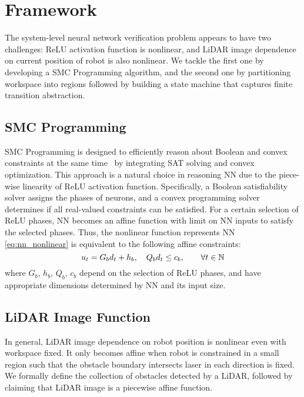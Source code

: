 \section{Framework}

The system-level neural network verification problem appears to have two challenges:
ReLU activation function is nonlinear, and LiDAR image dependence on current position of robot is also nonlinear.
We tackle the first one by developing a SMC Programming algorithm,
and the second one by partitioning workspace into regions followed by building a state machine 
that captures finite transition abstraction.


\subsection{SMC Programming}

SMC Programming is designed to efficiently reason about Boolean and convex constraints 
at the same time~\cite{Shoukry2018SMC} by integrating SAT solving and convex optimization.
This approach is a natural choice in reasoning NN due to the piece-wise linearity of ReLU activation function.
Specifically, a Boolean satisfiability solver assigns the phases of neurons, and a convex programming solver 
determines if all real-valued constraints can be satisfied. 
For a certain selection of ReLU phases, NN becomes an affine function with limit on NN inputs to satisfy the selected phases. 
Thus, the nonlinear function represents NN \eqref{eq:nn_nonlinear} is equivalent to the following affine constraints:
\begin{equation}
    \label{eq:nn_linear}  
    u_t =  G_b d_t + h_b, \quad Q_b d_t \le c_b, \qquad \forall t \in {\mathbb{N}} 
\end{equation}
where $G_b$, $h_b$, $Q_b$, $c_b$ depend on the selection of ReLU phases, and have appropriate dimensions 
determined by NN and its input size.




\subsection{LiDAR Image Function}

In general, LiDAR image dependence on robot position is nonlinear even with workspace fixed.
It only becomes affine when robot is constrained in a small region such that 
the obstacle boundary intersects laser in each direction is fixed.
We formally define the collection of obstacles detected by a LiDAR, followed by claiming that LiDAR image is a piecewise affine function.

